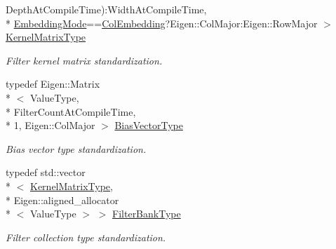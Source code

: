 \begin{DoxyCompactItemize}
Depth\-At\-Compile\-Time)\-:Width\-At\-Compile\-Time, \\*
\hyperlink{namespaceffnn_1_1layer_a254f16beba4fb335d935e9b43bb9e69a}{Embedding\-Mode}==\hyperlink{namespaceffnn_1_1layer_a254f16beba4fb335d935e9b43bb9e69aa42ac01b35d45fd60256ef5008c96c049}{Col\-Embedding}?Eigen\-::\-Col\-Major\-:\-Eigen\-::\-Row\-Major $>$ \hyperlink{classffnn_1_1layer_1_1_receptive_volume_af207f604ba81e52546c400dd85de014f}{Kernel\-Matrix\-Type}
\begin{DoxyCompactList}\small\item\em Filter kernel matrix standardization. \end{DoxyCompactList}\item 
typedef Eigen\-::\-Matrix\\*
$<$ Value\-Type, \\*
Filter\-Count\-At\-Compile\-Time, \\*
1, Eigen\-::\-Col\-Major $>$ \hyperlink{classffnn_1_1layer_1_1_receptive_volume_a22ec68a5323233ca8bbcacc2b7387dbb}{Bias\-Vector\-Type}
\begin{DoxyCompactList}\small\item\em Bias vector type standardization. \end{DoxyCompactList}\item 
typedef std\-::vector\\*
$<$ \hyperlink{classffnn_1_1layer_1_1_receptive_volume_af207f604ba81e52546c400dd85de014f}{Kernel\-Matrix\-Type}, \\*
Eigen\-::aligned\-\_\-allocator\\*
$<$ Value\-Type $>$ $>$ \hyperlink{classffnn_1_1layer_1_1_receptive_volume_a7c97795baaf3c9b1e7db3cb3841d8829}{Filter\-Bank\-Type}
\begin{DoxyCompactList}\small\item\em Filter collection type standardization. \end{DoxyCompactList}\end{DoxyCompactItemize}
